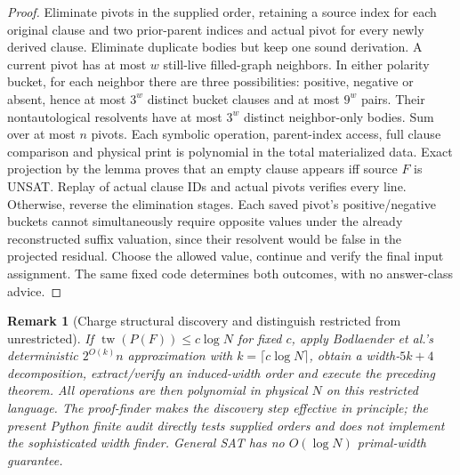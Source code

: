 \documentclass[11pt]{article}
\newtheorem{remark}[theorem]{Remark}
\begin{document}
\begin{proof}
Eliminate pivots in the supplied order, retaining a source index for each original clause and two prior-parent indices and actual pivot for every newly derived clause. Eliminate duplicate bodies but keep one sound derivation. A current pivot has at most $w$ still-live filled-graph neighbors. In either polarity bucket, for each neighbor there are three possibilities: positive, negative or absent, hence at most $3^w$ distinct bucket clauses and at most $9^w$ pairs. Their nontautological resolvents have at most $3^w$ distinct neighbor-only bodies. Sum over at most $n$ pivots. Each symbolic operation, parent-index access, full clause comparison and physical print is polynomial in the total materialized data. Exact projection by the lemma proves that an empty clause appears iff source $F$ is UNSAT. Replay of actual clause IDs and actual pivots verifies every line. Otherwise, reverse the elimination stages. Each saved pivot's positive/negative buckets cannot simultaneously require opposite values under the already reconstructed suffix valuation, since their resolvent would be false in the projected residual. Choose the allowed value, continue and verify the final input assignment. The same fixed code determines both outcomes, with no answer-class advice.
\end{proof}

\begin{remark}[Charge structural discovery and distinguish restricted from unrestricted]
If $\operatorname{tw}(P(F))\le c\log N$ for fixed $c$, apply Bodlaender et al.'s deterministic $2^{O(k)}n$ approximation with $k=\lceil c\log N\rceil$, obtain a width-$5k+4$ decomposition, extract/verify an induced-width order and execute the preceding theorem. All operations are then polynomial in physical $N$ on this \emph{restricted} language. The proof-finder makes the discovery step effective in principle; the present Python finite audit directly tests supplied orders and does not implement the sophisticated width finder. General SAT has no $O(\log N)$ primal-width guarantee.
\end{remark}
\end{document}
